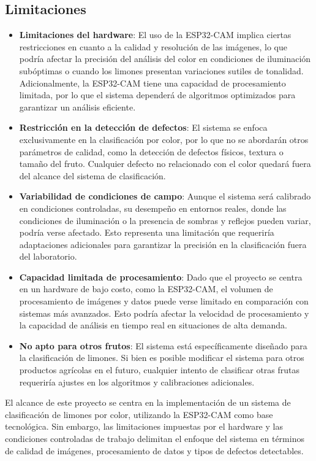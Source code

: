 \subsection{Limitaciones}
\begin{itemize}
    \item \textbf{Limitaciones del hardware}: El uso de la ESP32-CAM implica ciertas restricciones en cuanto a la calidad y resolución de las imágenes, lo que podría afectar la precisión del análisis del color en condiciones de iluminación subóptimas o cuando los limones presentan variaciones sutiles de tonalidad. Adicionalmente, la ESP32-CAM tiene una capacidad de procesamiento limitada, por lo que el sistema dependerá de algoritmos optimizados para garantizar un análisis eficiente.
    
    \item \textbf{Restricción en la detección de defectos}: El sistema se enfoca exclusivamente en la clasificación por color, por lo que no se abordarán otros parámetros de calidad, como la detección de defectos físicos, textura o tamaño del fruto. Cualquier defecto no relacionado con el color quedará fuera del alcance del sistema de clasificación.
    
    \item \textbf{Variabilidad de condiciones de campo}: Aunque el sistema será calibrado en condiciones controladas, su desempeño en entornos reales, donde las condiciones de iluminación o la presencia de sombras y reflejos pueden variar, podría verse afectado. Esto representa una limitación que requeriría adaptaciones adicionales para garantizar la precisión en la clasificación fuera del laboratorio.
    
    \item \textbf{Capacidad limitada de procesamiento}: Dado que el proyecto se centra en un hardware de bajo costo, como la ESP32-CAM, el volumen de procesamiento de imágenes y datos puede verse limitado en comparación con sistemas más avanzados. Esto podría afectar la velocidad de procesamiento y la capacidad de análisis en tiempo real en situaciones de alta demanda.
    
    \item \textbf{No apto para otros frutos}: El sistema está específicamente diseñado para la clasificación de limones. Si bien es posible modificar el sistema para otros productos agrícolas en el futuro, cualquier intento de clasificar otras frutas requeriría ajustes en los algoritmos y calibraciones adicionales.
\end{itemize}

El alcance de este proyecto se centra en la implementación de un sistema de clasificación de limones por color, utilizando la ESP32-CAM como base tecnológica. Sin embargo, las limitaciones impuestas por el hardware y las condiciones controladas de trabajo delimitan el enfoque del sistema en términos de calidad de imágenes, procesamiento de datos y tipos de defectos detectables.
